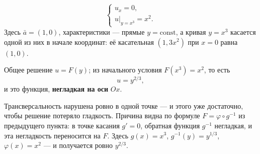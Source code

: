 \begin{example}
\[
  \begin{cases}
    u_x = 0, \\
    u|_{y = x^3} = x^2 .
  \end{cases}
\]
Здесь $\bar a = (1,0)$, характеристики — прямые $y = \mathrm{const}$, а кривая
$y = x^3$ касается одной из них в начале координат: её касательная
$(1, 3x^2)$ при $x = 0$ равна $(1,0)$.

\medskip
Общее решение $u = F(y)$; из начального условия $F(x^3) = x^2$, то есть
\[
  u = y^{2/3} ,
\]
и это функция, \textbf{негладкая на оси} $Ox$.
\end{example}


\begin{idea}
Трансверсальность нарушена ровно в одной точке — и этого уже достаточно, чтобы
решение потеряло гладкость. Причина видна по формуле $F = \varphi \circ g^{-1}$
из предыдущего пункта: в точке касания $g' = 0$, обратная функция $g^{-1}$
негладкая, и эта негладкость переносится на $F$. Здесь $g(x) = x^3$,
$g^{-1}(y) = y^{1/3}$, $\varphi(x) = x^2$ — и получается ровно $y^{2/3}$.
\end{idea}
